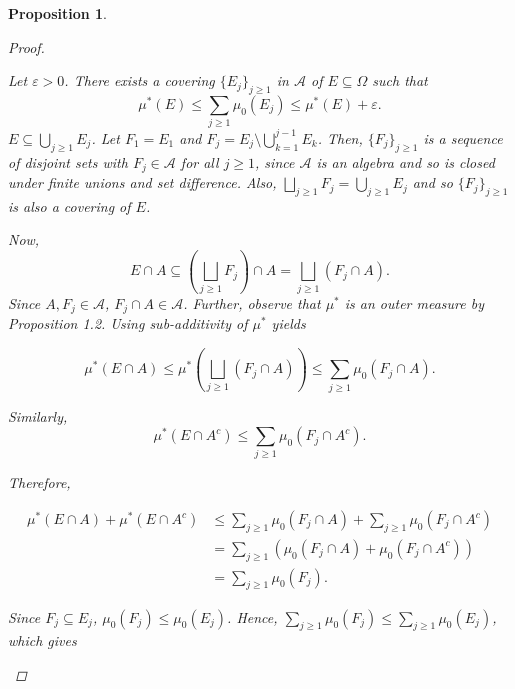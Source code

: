\documentclass{article}
\newcommand{\A}{\mathscr{A}}
\theoremstyle{spaced}
\newtheorem{proposition}[theorem]{Proposition}
\begin{document}
\begin{proposition}
\begin{proof}
\begin{enumerate}
            Let $\varepsilon > 0$. There exists a covering $\{E_j\}_{j \geq 1}$ in $\A$ of $E \subseteq \Omega$ such that
            \begin{equation}
                \mu^*(E) \leq \sum_{j \geq 1} \mu_0(E_j) \leq \mu^*(E) + \varepsilon.
            \end{equation}
            $E \subseteq \bigcup_{j \geq 1} E_j$. Let $F_1 = E_1$ and $F_j = E_j \setminus \bigcup_{k=1}^{j-1}E_k$. Then, $\{F_j\}_{j\geq1}$ is a sequence of disjoint sets with $F_j \in \A$ for all $j \geq 1$, since $\A$ is an algebra and so is closed under finite unions and set difference. Also, $\bigsqcup_{j \geq 1} F_j = \bigcup_{j \geq 1} E_j$ and so $\{F_j\}_{j \geq 1}$ is also a covering of $E$.

            Now, 
            \begin{equation*}
                E \cap A \subseteq \left( \bigsqcup_{j \geq 1} F_j \right) \cap A = \bigsqcup_{j \geq 1} (F_j \cap A).
            \end{equation*}
            Since $A, F_j \in \A$, $F_j \cap A \in \A$. Further, observe that $\mu^*$ is an outer measure by Proposition 1.2. Using sub-additivity of $\mu^*$ yields

            \begin{equation*}
                \mu^*(E \cap A) \leq \mu^*\left( \bigsqcup_{j \geq 1} (F_j \cap A) \right) \leq \sum_{j \geq 1} \mu_0(F_j \cap A).
            \end{equation*}

            Similarly, 
             \begin{equation*}
                \mu^*(E \cap A^c) \leq \sum_{j \geq 1} \mu_0(F_j \cap A^c).
            \end{equation*}

            Therefore,
            
            \begin{align*}
                \mu^*(E \cap A) + \mu^*(E \cap A^c) &\leq \sum_{j \geq 1} \mu_0(F_j \cap A) + \sum_{j \geq 1} \mu_0(F_j \cap A^c) \\
                &= \sum_{j \geq 1} (\mu_0(F_j \cap A) + \mu_0(F_j \cap A^c))  \\
                &= \sum_{j \geq 1} \mu_0(F_j).
            \end{align*}

            Since $F_j \subseteq E_j$, $\mu_0(F_j) \leq \mu_0(E_j)$. Hence, $\sum_{j \geq 1} \mu_0(F_j) \leq \sum_{j \geq 1} \mu_0(E_j)$, which gives


\end{enumerate}
\end{proof}
\end{proposition}
\end{document}

